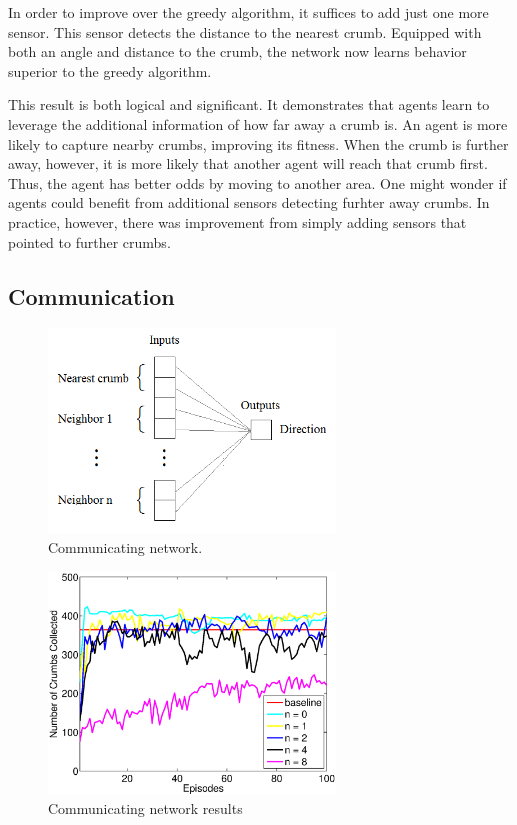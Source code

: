 \documentclass[conference]{IEEEtran}
\begin{document}
In order to improve over the greedy algorithm, it suffices to add just one more sensor. This sensor detects the distance to the nearest crumb. Equipped with both an angle and distance to the crumb, the network now learns behavior superior to the greedy algorithm.

This result is both logical and significant. It demonstrates that agents learn to leverage the additional information of how far away a crumb is. An agent is more likely to capture nearby crumbs, improving its fitness. When the crumb is further away, however, it is more likely that another agent will reach that crumb first. Thus, the agent has better odds by moving to another area. 
One might wonder if agents could benefit from additional sensors detecting furhter away crumbs. In practice, however, there was improvement from simply adding sensors that pointed to further crumbs.

\subsection{Communication}


\begin{figure}[t]
\centering
\includegraphics[width=3.0in]{./figures/neroevolution/comm_network.png}
\caption{Communicating network.}
\label{neroevolution:communication}
\end{figure}

\begin{figure}[t]
\centering
\includegraphics[width=3.0in]{./figures/neroevolution/comm_result.eps}
\caption{Communicating network results}
\label{neroevolution:communication_results}
\end{figure}
\end{document}
